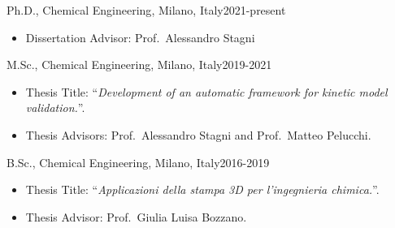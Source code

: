 \begin{position}{Ph.D., Chemical Engineering}{\polimi, Milano, Italy}{2021-present}
   \begin{itemize}
      \item[ ] Dissertation Advisor: Prof.\ Alessandro Stagni
   \end{itemize}
\end{position}

\begin{position}{M.Sc., Chemical Engineering}{\polimi, Milano, Italy}{2019-2021}
   \begin{itemize}
      \item[ ] Thesis Title: ``{\it Development of an automatic framework for kinetic model validation.}''.
      \item[ ] Thesis Advisors: Prof.\ Alessandro Stagni and Prof.\ Matteo Pelucchi.
   \end{itemize}
\end{position}

\begin{position}{B.Sc., Chemical Engineering}{\polimi, Milano, Italy}{2016-2019}
   \begin{itemize}
      \item[ ] Thesis Title: ``{\it Applicazioni della stampa 3D per l'ingegnieria chimica.}''.
      \item[ ] Thesis Advisor: Prof.\ Giulia Luisa Bozzano.
   \end{itemize}
\end{position}

